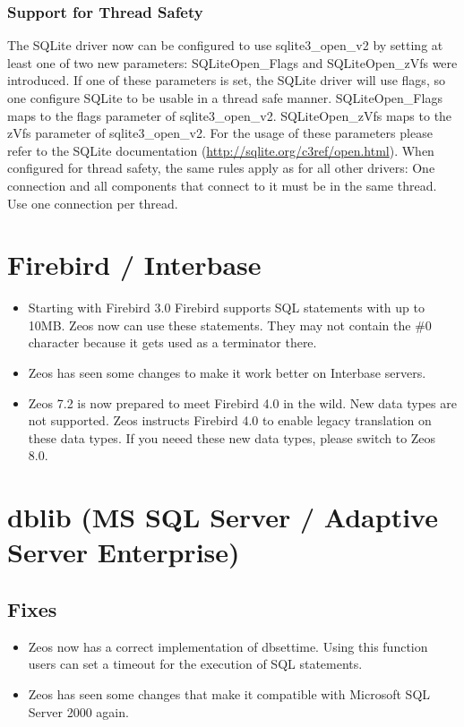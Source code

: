 \documentclass[a4paper,12pt,oneside]{book}
\begin{document}
\subsubsection{Support for Thread Safety}
The SQLite driver now can be configured to use sqlite3\_open\_v2 by setting at least one of two new parameters:
SQLiteOpen\_Flags and SQLiteOpen\_zVfs were introduced.
If one of these parameters is set, the SQLite driver will use flags, so one configure SQLite to be usable in a thread safe manner.
SQLiteOpen\_Flags maps to the flags parameter of sqlite3\_open\_v2.
SQLiteOpen\_zVfs maps to the zVfs parameter of sqlite3\_open\_v2.
For the usage of these parameters please refer to the SQLite documentation (\url{http://sqlite.org/c3ref/open.html}).
When configured for thread safety, the same rules apply as for all other drivers:
One connection and all components that connect to it must be in the same thread.
Use one connection per thread.

\section{Firebird / Interbase}
\begin{itemize}
\item Starting with Firebird 3.0 Firebird supports SQL statements with up to 10MB. Zeos now can use these statements. They may not contain the \#0 character because it gets used as a terminator there.
\item Zeos has seen some changes to make it work better on Interbase servers.
\item Zeos 7.2 is now prepared to meet Firebird 4.0 in the wild. New data types are not supported. Zeos instructs Firebird 4.0 to enable legacy translation on these data types. If you neeed these new data types, please switch to Zeos 8.0.
\end{itemize}

\section{dblib (MS SQL Server / Adaptive Server Enterprise)}

\subsection{Fixes}

\begin{itemize}
\item Zeos now has a correct implementation of dbsettime. Using this function users can set a timeout for the execution of SQL statements.
\item Zeos has seen some changes that make it compatible with Microsoft SQL Server 2000 again.
\end{itemize}
\end{document}
